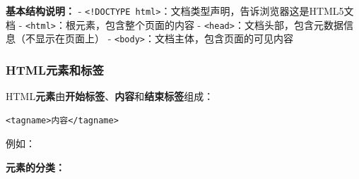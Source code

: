 \textbf{基本结构说明：} - \texttt{\textless{}!DOCTYPE\ html\textgreater{}}：文档类型声明，告诉浏览器这是HTML5文档 - \texttt{\textless{}html\textgreater{}}：根元素，包含整个页面的内容 - \texttt{\textless{}head\textgreater{}}：文档头部，包含元数据信息（不显示在页面上） - \texttt{\textless{}body\textgreater{}}：文档主体，包含页面的可见内容

\subsubsection{HTML元素和标签}\label{htmlux5143ux7d20ux548cux6807ux7b7e}

HTML\textbf{元素}由\textbf{开始标签}、\textbf{内容}和\textbf{结束标签}组成：

\begin{verbatim}
<tagname>内容</tagname>
\end{verbatim}

例如：

\begin{Shaded}
\begin{Highlighting}[]
\DataTypeTok{\textless{}}\DataTypeTok{\textgreater{}}\DataTypeTok{\textless{}/}\DataTypeTok{\textgreater{}}
\DataTypeTok{\textless{}}\DataTypeTok{\textgreater{}}\DataTypeTok{\textless{}/}\DataTypeTok{\textgreater{}}
\end{Highlighting}
\end{Shaded}

\textbf{元素的分类：}

